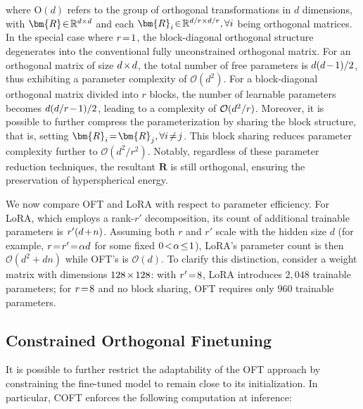 where $\text{O}(d)$ refers to the group of orthogonal transformations in $d$ dimensions, with $\thickmuskip=2mu \medmuskip=2mu \bm{R}\in\mathbb{R}^{d\times d}$ and each $\thickmuskip=2mu \medmuskip=2mu \bm{R}_i\in\mathbb{R}^{d/r\times d/r},\forall i$ being orthogonal matrices. In the special case where $\thickmuskip=2mu \medmuskip=2mu r=1$, the block-diagonal orthogonal structure degenerates into the conventional fully unconstrained orthogonal matrix. For an orthogonal matrix of size $\thickmuskip=2mu \medmuskip=2mu d\times d$, the total number of free parameters is $\thickmuskip=2mu \medmuskip=2mu d(d-1)/2$, thus exhibiting a parameter complexity of $\mathcal{O}(d^2)$. For a block-diagonal orthogonal matrix divided into $r$ blocks, the number of learnable parameters becomes $\thickmuskip=2mu \medmuskip=2mu d(d/r-1)/2$, leading to a complexity of $\thickmuskip=2mu \medmuskip=2mu \mathcal{O}(d^2/r)$. Moreover, it is possible to further compress the parameterization by sharing the block structure, that is, setting $\thickmuskip=2mu \medmuskip=2mu\bm{R}_i=\bm{R}_j,\forall i\neq j$. This block sharing reduces parameter complexity further to $\mathcal{O}(d^2/r^2)$. Notably, regardless of these parameter reduction techniques, the resultant $\bm{R}$ is still orthogonal, ensuring the preservation of hyperspherical energy.

We now compare OFT and LoRA with respect to parameter efficiency. For LoRA, which employs a rank-$r'$ decomposition, its count of additional trainable parameters is $\thickmuskip=2mu \medmuskip=2mu r'(d+n)$. Assuming both $r$ and $r'$ scale with the hidden size $d$ (for example, $\thickmuskip=2mu \medmuskip=2mu r=r'=\alpha d$ for some fixed $\thickmuskip=2mu \medmuskip=2mu 0<\alpha\leq 1$), LoRA's parameter count is then $\mathcal{O}(d^2+dn)$ while OFT's is $\mathcal{O}(d)$. To clarify this distinction, consider a weight matrix with dimensions $\thickmuskip=2mu \medmuskip=2mu 128\times 128$: with $\thickmuskip=2mu \medmuskip=2mu r'=8$, LoRA introduces $2,048$ trainable parameters; for $\thickmuskip=2mu \medmuskip=2mu r=8$ and no block sharing, OFT requires only $960$ trainable parameters.

\subsection{Constrained Orthogonal Finetuning}

It is possible to further restrict the adaptability of the OFT approach by constraining the fine-tuned model to remain close to its initialization. In particular, COFT enforces the following computation at inference:

